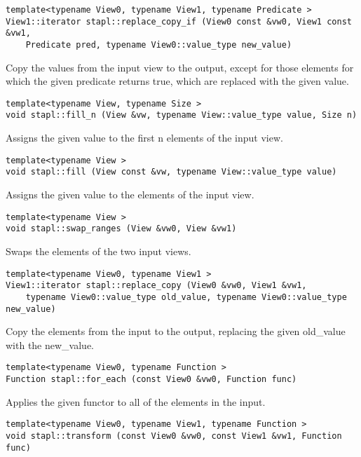 \begin{verbatim}
template<typename View0, typename View1, typename Predicate >
View1::iterator stapl::replace_copy_if (View0 const &vw0, View1 const &vw1,
    Predicate pred, typename View0::value_type new_value)
\end{verbatim}

Copy the values from the input view to the output, except for those elements for which the given predicate returns true, which are replaced with the given value.

\begin{verbatim}
template<typename View, typename Size >
void stapl::fill_n (View &vw, typename View::value_type value, Size n)
\end{verbatim}

Assigns the given value to the first n elements of the input view.

\begin{verbatim}
template<typename View >
void stapl::fill (View const &vw, typename View::value_type value)
\end{verbatim}

Assigns the given value to the elements of the input view.

\begin{verbatim}
template<typename View >
void stapl::swap_ranges (View &vw0, View &vw1)
\end{verbatim}

Swaps the elements of the two input views.

\begin{verbatim}
template<typename View0, typename View1 >
View1::iterator stapl::replace_copy (View0 &vw0, View1 &vw1,
    typename View0::value_type old_value, typename View0::value_type new_value)
\end{verbatim}

Copy the elements from the input to the output, replacing the given old\_value with the new\_value.

\begin{verbatim}
template<typename View0, typename Function >
Function stapl::for_each (const View0 &vw0, Function func)
\end{verbatim}

Applies the given functor to all of the elements in the input.

\begin{verbatim}
template<typename View0, typename View1, typename Function >
void stapl::transform (const View0 &vw0, const View1 &vw1, Function func)
\end{verbatim}


